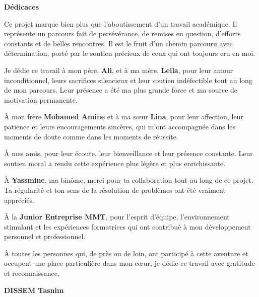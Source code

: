 \clearpage
\thispagestyle{empty}

\vspace*{5cm}

\begin{center}
\textbf{\LARGE Dédicaces}
\end{center}

\vspace{1cm}

Ce projet marque bien plus que l’aboutissement d’un travail académique. Il représente un parcours fait de persévérance, de remises en question, d’efforts constants et de belles rencontres. Il est le fruit d’un chemin parcouru avec détermination, porté par le soutien précieux de ceux qui ont toujours cru en moi.

Je dédie ce travail à mon père, \textbf{Ali}, et à ma mère, \textbf{Leila}, pour leur amour inconditionnel, leurs sacrifices silencieux et leur soutien indéfectible tout au long de mon parcours. Leur présence a été ma plus grande force et ma source de motivation permanente.

À mon frère \textbf{Mohamed Amine} et à ma sœur \textbf{Lina}, pour leur affection, leur patience et leurs encouragements sincères, qui m’ont accompagnée dans les moments de doute comme dans les moments de réussite.

À mes amis, pour leur écoute, leur bienveillance et leur présence constante. Leur soutien moral a rendu cette expérience plus légère et plus enrichissante.

À \textbf{Yassmine}, ma binôme, merci pour ta collaboration tout au long de ce projet. Ta régularité et ton sens de la résolution de problèmes ont été vraiment appréciés.

À la \textbf{Junior Entreprise MMT}, pour l’esprit d’équipe, l’environnement stimulant et les expériences formatrices qui ont contribué à mon développement personnel et professionnel.

À toutes les personnes qui, de près ou de loin, ont participé à cette aventure et occupent une place particulière dans mon cœur, je dédie ce travail avec gratitude et reconnaissance.
\vfill
\begin{flushright}
\textbf{DISSEM Tasnim}
\end{flushright}
\clearpage
\thispagestyle{empty}

\vspace*{5cm}

